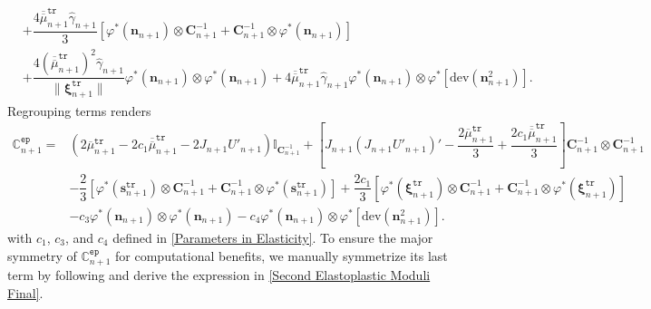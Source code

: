 \documentclass[preprint,11pt]{elsarticle}
\theoremstyle{definition}
\begin{document}
\begin{equation*}
\begin{array}{ll}
        &+ \dfrac{4 \overline{\overline{\mu}}_{n+1}^\texttt{tr} \widehat{\gamma}_{n+1}}{3} \left[ \varphi^* \left( \mathbf{n}_{n+1} \right) \otimes \mathbf{C}_{n+1}^{-1}
        + \mathbf{C}_{n+1}^{-1} \otimes \varphi^* \left( \mathbf{n}_{n+1} \right) \right] \\[12pt] 

        &+ \dfrac{4 \left( \overline{\overline{\mu}}_{n+1}^\texttt{tr} \right)^2 \widehat{\gamma}_{n+1}}{\lVert \boldsymbol{\xi}_{n+1}^\texttt{tr} \rVert}
        \varphi^*(\mathbf{n}_{n+1}) \otimes
        \varphi^*(\mathbf{n}_{n+1})
        
        + 4 \overline{\overline{\mu}}_{n+1}^\texttt{tr} \widehat{\gamma}_{n+1} \varphi^*(\mathbf{n}_{n+1}) \otimes \varphi^*\left[ \text{dev} (\mathbf{n}_{n+1}^2) \right].
    \end{array}
\end{equation*}
Regrouping terms renders
\begin{equation*}
    \begin{array}{ll}
        \mathbb{C}_{n+1}^\texttt{ep} = &\left( 2 \overline{\mu}_{n+1}^\texttt{tr} - 2 c_1 \overline{\overline{\mu}}_{n+1}^\texttt{tr} - 2 J_{n+1} U'_{n+1} \right) \mathbb{I}_{\mathbf{C}_{n+1}^{-1}}
        
        + \left[ J_{n+1} (J_{n+1} U'_{n+1})' - \dfrac{2 \overline{\mu}_{n+1}^\texttt{tr}}{3} + \dfrac{2 c_1 \overline{\overline{\mu}}_{n+1}^\texttt{tr}}{3} \right] \mathbf{C}_{n+1}^{-1} \otimes \mathbf{C}_{n+1}^{-1} \\[12pt]
        
        &- \dfrac{2}{3} \left[ \varphi^*(\mathbf{s}_{n+1}^\texttt{tr}) \otimes \mathbf{C}_{n+1}^{-1} + \mathbf{C}_{n+1}^{-1} \otimes \varphi^*(\mathbf{s}_{n+1}^\texttt{tr}) \right]

        + \dfrac{2 c_1}{3} \left[ \varphi^*(\boldsymbol{\xi}_{n+1}^\texttt{tr}) \otimes \mathbf{C}_{n+1}^{-1} + \mathbf{C}_{n+1}^{-1} \otimes \varphi^*(\boldsymbol{\xi}_{n+1}^\texttt{tr}) \right] \\[12pt]

        &- c_3 \varphi^*(\mathbf{n}_{n+1}) \otimes \varphi^*(\mathbf{n}_{n+1})

        - c_4 \varphi^*(\mathbf{n}_{n+1}) \otimes \varphi^*\left[ \text{dev} (\mathbf{n}_{n+1}^2) \right].
    \end{array}
\end{equation*}
with $c_1$, $c_3$, and $c_4$ defined in \eqref{Parameters in Elasticity}. To ensure the major symmetry of $\mathbb{C}_{n+1}^\texttt{ep}$ for computational benefits, we manually symmetrize its last term by following \citet{simo_framework_1988} and derive the expression in \eqref{Second Elastoplastic Moduli Final}.
\end{document}

